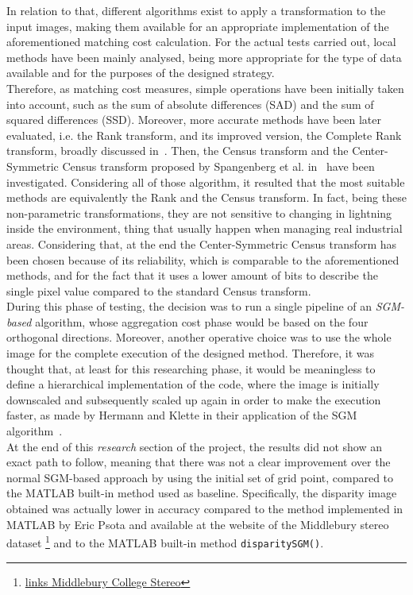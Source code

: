 In relation to that, different algorithms exist to apply a transformation to the input images, making them available for an appropriate implementation of the aforementioned matching cost calculation.
For the actual tests carried out, local methods have been mainly analysed, being more appropriate for the type of data available and for the purposes of the designed strategy.\\
Therefore, as matching cost measures, simple operations have been initially taken into account, such as the sum of absolute differences (SAD) and the sum of squared differences (SSD). 
Moreover, more accurate methods have been later evaluated, i.e. the Rank transform, and its improved version, the Complete Rank transform, broadly discussed in~\cite{Demetz2013}.
Then, the Census transform and the Center-Symmetric Census transform proposed by Spangenberg et al. in~\cite{Spangenberg2013} have been investigated.
Considering all of those algorithm, it resulted that the most suitable methods are equivalently the Rank and the Census transform.
In fact, being these non-parametric transformations, they are not sensitive to changing in lightning inside the environment, thing that usually happen when managing real industrial areas. 
Considering that, at the end the Center-Symmetric Census transform has been chosen because of its reliability, which is comparable to the aforementioned methods, and for the fact that it uses a lower amount of bits to describe the single pixel value compared to the standard Census transform.\\
During this phase of testing, the decision was to run a single pipeline of an \textit{SGM-based} algorithm, whose aggregation cost phase would be based on the four orthogonal directions. 
Moreover, another operative choice was to use the whole image for the complete execution of the designed method.
Therefore, it was thought that, at least for this researching phase, it would be meaningless to define a hierarchical implementation of the code, where the image is initially downscaled and subsequently scaled up again in order to make the execution faster, as made by Hermann and Klette in their application of the SGM algorithm~\cite{Hermann2013}.\\
At the end of this \textit{research} section of the project, the results did not show an exact path to follow, meaning that there was not a clear improvement over the normal SGM-based approach by using the initial set of grid point, compared to the MATLAB built-in method used as baseline. 
Specifically, the disparity image obtained was actually lower in accuracy compared to the method implemented in MATLAB by Eric Psota and available at the website of the Middlebury stereo dataset \footnote{\href{http://vision.middlebury.edu/stereo/submit3}{links Middlebury College Stereo}} and to the MATLAB built-in method \texttt{disparitySGM()}. 
